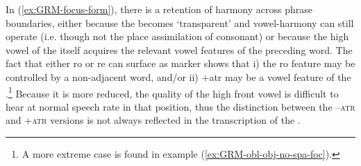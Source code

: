 In (\ref{ex:GRM-focus-form}), there is a retention of harmony across phrase boundaries, either because the  becomes `transparent' and vowel-harmony can still operate (i.e. though not the place assimilation of  consonant) or because the high vowel of the  itself acquires the relevant  vowel features of  the  preceding word. The fact that either {\sls ro} or {\sls re} can surface as  marker shows 
that i) the  {\sc ro} feature may be controlled by a non-adjacent word, and/or ii)   {\sc +atr} may be a vowel feature of the .\footnote{A more extreme case is found in example (\ref{ex:GRM-obl-obj-no-spa-foc}).}  Because it is more reduced, the quality of the high front vowel is difficult to hear at normal speech rate in that position, thus the distinction between the  \textsc{--atr} and   \textsc{+atr} versions is not always reflected in the 
transcription of the .




